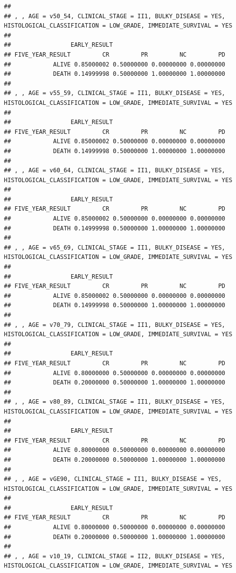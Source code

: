 \documentclass[]{article}
\begin{document}
\begin{verbatim}
## 
## , , AGE = v50_54, CLINICAL_STAGE = II1, BULKY_DISEASE = YES, HISTOLOGICAL_CLASSIFICATION = LOW_GRADE, IMMEDIATE_SURVIVAL = YES
## 
##                 EARLY_RESULT
## FIVE_YEAR_RESULT         CR         PR         NC         PD
##            ALIVE 0.85000002 0.50000000 0.00000000 0.00000000
##            DEATH 0.14999998 0.50000000 1.00000000 1.00000000
## 
## , , AGE = v55_59, CLINICAL_STAGE = II1, BULKY_DISEASE = YES, HISTOLOGICAL_CLASSIFICATION = LOW_GRADE, IMMEDIATE_SURVIVAL = YES
## 
##                 EARLY_RESULT
## FIVE_YEAR_RESULT         CR         PR         NC         PD
##            ALIVE 0.85000002 0.50000000 0.00000000 0.00000000
##            DEATH 0.14999998 0.50000000 1.00000000 1.00000000
## 
## , , AGE = v60_64, CLINICAL_STAGE = II1, BULKY_DISEASE = YES, HISTOLOGICAL_CLASSIFICATION = LOW_GRADE, IMMEDIATE_SURVIVAL = YES
## 
##                 EARLY_RESULT
## FIVE_YEAR_RESULT         CR         PR         NC         PD
##            ALIVE 0.85000002 0.50000000 0.00000000 0.00000000
##            DEATH 0.14999998 0.50000000 1.00000000 1.00000000
## 
## , , AGE = v65_69, CLINICAL_STAGE = II1, BULKY_DISEASE = YES, HISTOLOGICAL_CLASSIFICATION = LOW_GRADE, IMMEDIATE_SURVIVAL = YES
## 
##                 EARLY_RESULT
## FIVE_YEAR_RESULT         CR         PR         NC         PD
##            ALIVE 0.85000002 0.50000000 0.00000000 0.00000000
##            DEATH 0.14999998 0.50000000 1.00000000 1.00000000
## 
## , , AGE = v70_79, CLINICAL_STAGE = II1, BULKY_DISEASE = YES, HISTOLOGICAL_CLASSIFICATION = LOW_GRADE, IMMEDIATE_SURVIVAL = YES
## 
##                 EARLY_RESULT
## FIVE_YEAR_RESULT         CR         PR         NC         PD
##            ALIVE 0.80000000 0.50000000 0.00000000 0.00000000
##            DEATH 0.20000000 0.50000000 1.00000000 1.00000000
## 
## , , AGE = v80_89, CLINICAL_STAGE = II1, BULKY_DISEASE = YES, HISTOLOGICAL_CLASSIFICATION = LOW_GRADE, IMMEDIATE_SURVIVAL = YES
## 
##                 EARLY_RESULT
## FIVE_YEAR_RESULT         CR         PR         NC         PD
##            ALIVE 0.80000000 0.50000000 0.00000000 0.00000000
##            DEATH 0.20000000 0.50000000 1.00000000 1.00000000
## 
## , , AGE = vGE90, CLINICAL_STAGE = II1, BULKY_DISEASE = YES, HISTOLOGICAL_CLASSIFICATION = LOW_GRADE, IMMEDIATE_SURVIVAL = YES
## 
##                 EARLY_RESULT
## FIVE_YEAR_RESULT         CR         PR         NC         PD
##            ALIVE 0.80000000 0.50000000 0.00000000 0.00000000
##            DEATH 0.20000000 0.50000000 1.00000000 1.00000000
## 
## , , AGE = v10_19, CLINICAL_STAGE = II2, BULKY_DISEASE = YES, HISTOLOGICAL_CLASSIFICATION = LOW_GRADE, IMMEDIATE_SURVIVAL = YES

\end{verbatim}
\end{document}
